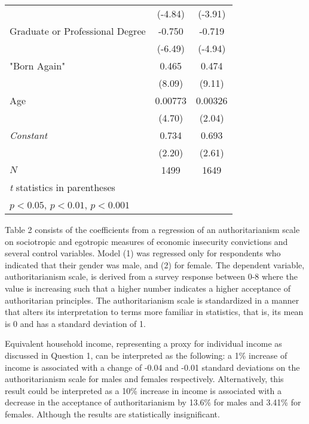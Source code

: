 \documentclass[11pt]{article}
\begin{document}
{\begin{table}[ht]
\begin{tabular}{l*{2}{c}}
            &     (-4.84)         &     (-3.91)         \\
[1em]
\hspace{\parindent} \hspace{\parindent} Graduate or Professional Degree      &      -0.750\sym{***}&      -0.719\sym{***}\\
            &     (-6.49)         &     (-4.94)         \\
[1em]
"Born Again"  &       0.465\sym{***}&       0.474\sym{***}\\
            &      (8.09)         &      (9.11)         \\
[1em]
Age         &     0.00773\sym{***}&     0.00326\sym{*}  \\
            &      (4.70)         &      (2.04)         \\
[1em]
\textit{Constant}      &       0.734\sym{*}  &       0.693\sym{**} \\
            &      (2.20)         &      (2.61)         \\
\hline
\(N\)       &        1499         &        1649         \\
\hline\hline
\multicolumn{3}{l}{\footnotesize \textit{t} statistics in parentheses}\\
\multicolumn{3}{l}{\footnotesize \sym{*} \(p<0.05\), \sym{**} \(p<0.01\), \sym{***} \(p<0.001\)}\\
\end{tabular}
\end{table}
}

Table 2 consists of the coefficients from a regression of an authoritarianism scale on sociotropic and egotropic measures of economic insecurity convictions and several control variables. Model (1) was regressed only for respondents who indicated that their gender was male, and (2) for female. The dependent variable, authoritarianism scale, is derived from a survey response between 0-8 where the value is increasing such that a higher number indicates a higher acceptance of authoritarian principles. The authoritarianism scale is standardized in a manner that alters its interpretation to terms more familiar in statistics, that is, its mean is 0 and has a standard deviation of 1.

Equivalent household income, representing a proxy for individual income as discussed  in Question 1, can be interpreted as the following: a 1\% increase of income is associated with a change of -0.04 and -0.01 standard deviations on the authoritarianism scale for males and females respectively. Alternatively, this result could be interpreted as a 10\% increase in income is associated with a decrease in the acceptance of authoritarianism by 13.6\% for males and 3.41\% for females. Although the results are statistically insignificant.  
\end{document}
